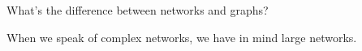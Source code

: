 
What's the difference between networks and graphs?

When we speak of complex networks, we have in
mind large networks.

